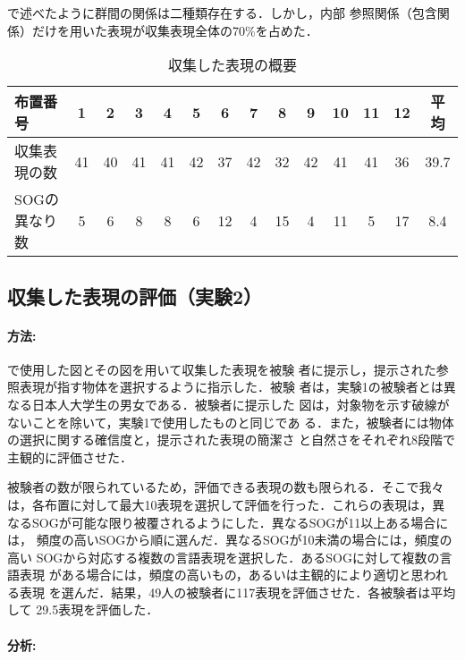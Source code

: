 \documentclass{nlp}
\begin{document}
で述べたように群間の関係は二種類存在する．しかし，内部
参照関係（包含関係）だけを用いた表現が収集表現全体の70\%を占めた．

\begin{table*}[htbp]
  \centering
  \caption{収集した表現の概要}\vspace{2mm}
  \begin{tabular}{l|cccccccccccc|c}\hline
    布置番号     & 1 & 2 & 3 & 4 & 5 & 6 & 7 &
    8 & 9 & 10 & 11 & 12 & 平均\\\hline
    収集表現の数 & 41 & 40 & 41 & 41 & 42 & 37 & 42 & 32 & 42
    & 41 & 41 & 36 & 39.7  \\
    SOGの異なり数 & 5 & 6 & 8 & 8 & 6 & 12 & 4 & 15 & 4 & 11 & 5 & 17
    & 8.4 \\ \hline
  \end{tabular}
  \label{tab:sum_data}
\end{table*}


\subsection{収集した表現の評価（実験2）}
\label{subsec:experiment2}

\paragraph{方法:}

で使用した図とその図を用いて収集した表現を被験
者に提示し，提示された参照表現が指す物体を選択するように指示した．被験
者は，実験1の被験者とは異なる日本人大学生の男女である．被験者に提示した
図は，対象物を示す破線がないことを除いて，実験1で使用したものと同じであ
る．また，被験者には物体の選択に関する確信度と，提示された表現の簡潔さ
と自然さをそれぞれ8段階で主観的に評価させた．

被験者の数が限られているため，評価できる表現の数も限られる．そこで我々
は，各布置に対して最大10表現を選択して評価を行った．これらの表現は，異
なるSOGが可能な限り被覆されるようにした．異なるSOGが11以上ある場合には，
頻度の高いSOGから順に選んだ．異なるSOGが10未満の場合には，頻度の高い
SOGから対応する複数の言語表現を選択した．あるSOGに対して複数の言語表現
がある場合には，頻度の高いもの，あるいは主観的により適切と思われる表現
を選んだ．結果，49人の被験者に117表現を評価させた．各被験者は平均して
29.5表現を評価した．

\paragraph{分析: }
\end{document}
